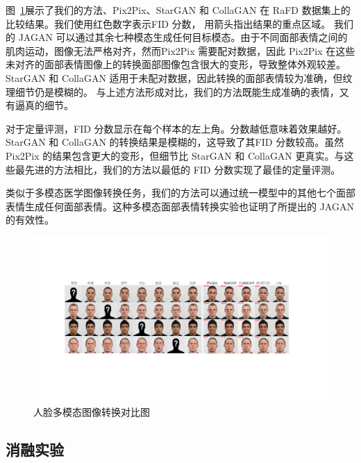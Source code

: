 图~\ref{fig:comparsion_facial}展示了我们的方法、Pix2Pix、StarGAN 和 CollaGAN 在 RaFD 数据集上的比较结果。我们使用红色数字表示FID 分数， 用箭头指出结果的重点区域。 我们的 JAGAN 可以通过其余七种模态生成任何目标模态。由于不同面部表情之间的肌肉运动，图像无法严格对齐，然而Pix2Pix 需要配对数据，因此 Pix2Pix 在这些未对齐的面部表情图像上的转换面部图像包含很大的变形，导致整体外观较差。 StarGAN 和 CollaGAN 适用于未配对数据，因此转换的面部表情较为准确，但纹理细节仍是模糊的。
与上述方法形成对比，我们的方法既能生成准确的表情，又有逼真的细节。

对于定量评测，FID 分数显示在每个样本的左上角。分数越低意味着效果越好。 StarGAN 和 CollaGAN 的转换结果是模糊的，这导致了其FID 分数较高。虽然 Pix2Pix 的结果包含更大的变形，但细节比 StarGAN 和 CollaGAN 更真实。与这些最先进的方法相比，我们的方法以最低的 FID 分数实现了最佳的定量评测。

类似于多模态医学图像转换任务，我们的方法可以通过统一模型中的其他七个面部表情生成任何面部表情。这种多模态面部表情转换实验也证明了所提出的 JAGAN 的有效性。

\begin{figure}
	\begin{center}
		\includegraphics[width=1\columnwidth]{figures/JAGAN/comparsion_facial.pdf}
	\end{center}
	\caption{人脸多模态图像转换对比图}
	\label{fig:comparsion_facial}
\end{figure}

\subsection{消融实验}

